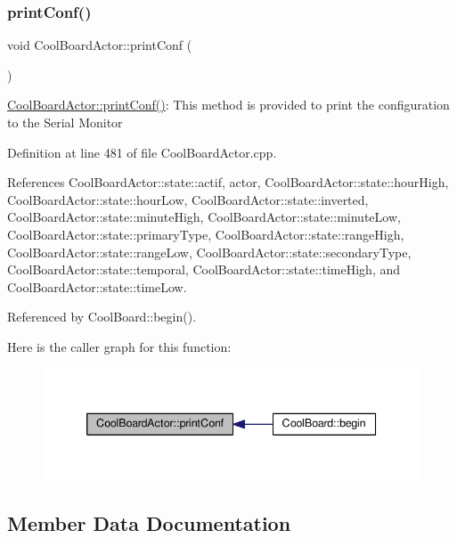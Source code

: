 \subsubsection{\texorpdfstring{print\+Conf()}{printConf()}}
{\footnotesize\ttfamily void Cool\+Board\+Actor\+::print\+Conf (\begin{DoxyParamCaption}{ }\end{DoxyParamCaption})}

\hyperlink{class_cool_board_actor_aabb10e7aebc3249ffc940530de29f84a}{Cool\+Board\+Actor\+::print\+Conf()}\+: This method is provided to print the configuration to the Serial Monitor 

Definition at line 481 of file Cool\+Board\+Actor.\+cpp.



References Cool\+Board\+Actor\+::state\+::actif, actor, Cool\+Board\+Actor\+::state\+::hour\+High, Cool\+Board\+Actor\+::state\+::hour\+Low, Cool\+Board\+Actor\+::state\+::inverted, Cool\+Board\+Actor\+::state\+::minute\+High, Cool\+Board\+Actor\+::state\+::minute\+Low, Cool\+Board\+Actor\+::state\+::primary\+Type, Cool\+Board\+Actor\+::state\+::range\+High, Cool\+Board\+Actor\+::state\+::range\+Low, Cool\+Board\+Actor\+::state\+::secondary\+Type, Cool\+Board\+Actor\+::state\+::temporal, Cool\+Board\+Actor\+::state\+::time\+High, and Cool\+Board\+Actor\+::state\+::time\+Low.



Referenced by Cool\+Board\+::begin().

Here is the caller graph for this function\+:\nopagebreak
\begin{figure}[H]
\begin{center}
\leavevmode
\includegraphics[width=339pt]{dc/d69/class_cool_board_actor_aabb10e7aebc3249ffc940530de29f84a_icgraph}
\end{center}
\end{figure}


\subsection{Member Data Documentation}
\mbox{\label{class_cool_board_actor_a8f190db9f7a39fddbcef7f152da970e9}} 

